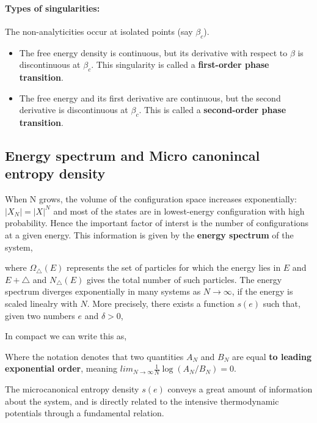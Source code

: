 \documentclass[letterpaper,english,12pt]{article}
\begin{document}
\paragraph{Types of singularities:}
The non-analyticities occur at isolated points (say $\beta_c$).
\begin{itemize}
\item
	The free energy density is continuous, but its derivative with respect to $\beta$ is discontinuous at $\beta_c$. This singularity is called a \textbf{first-order phase transition}.
\item
	The free energy and its first derivative are continuous, but the second derivative is discontinuous at $\beta_c$. This is called a \textbf{second-order phase transition}.
\end{itemize}

\subsection{Energy spectrum and Micro canonincal entropy density}
When N grows, the volume of the configuration space increases exponentially:$|X_N| = |X|^N$ and most of the states are in lowest-energy configuration with high probability. Hence the important factor of interst is the number of configurations at a given energy. This information is given by the \textbf{energy spectrum} of the system,

where $\Omega_\triangle (E)$ represents the set of particles for which the energy lies in $E$ and $E+\triangle$ and $N_\triangle (E)$ gives the total number of such particles.
The energy spectrum diverges exponentially in many systems as $N \rightarrow \infty$, if the energy is scaled linealry with $N$. More precisely, there exists a function $s(e)$ such that, given two numbers $e$ and $\delta > 0$,

In compact we can write this as,

Where the notation \red{=} denotes that two quantities $A_N$ and $B_N$ are equal \textbf{to leading exponential order}, meaning $lim_{N \rightarrow \infty} \frac{1}{N} \log (A_N/B_N)=0$.

The microcanonical entropy density $s(e)$ conveys a great amount of information about the system, and is directly related to the intensive thermodynamic
potentials through a fundamental relation.

\begin{prop}

\end{prop}
\end{document}
